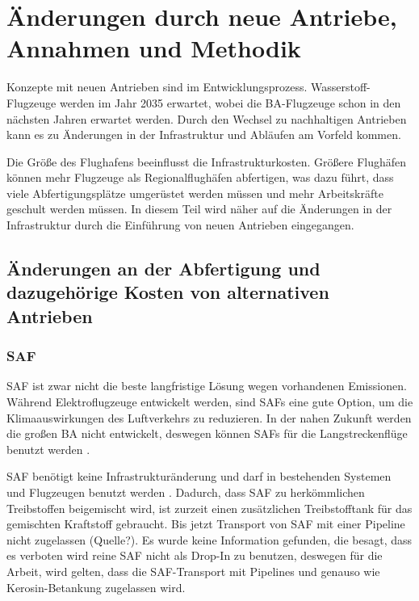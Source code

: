 \chapter{Änderungen durch neue Antriebe, Annahmen und Methodik}
\label{ch:Änderungen durch neue Antriebe, Annahmen und Methodik}

Konzepte mit neuen Antrieben sind im Entwicklungsprozess. Wasserstoff-Flugzeuge werden im Jahr 2035 erwartet, wobei die BA-Flugzeuge
schon in den nächsten Jahren erwartet werden.
Durch den Wechsel zu nachhaltigen Antrieben kann es zu Änderungen in der Infrastruktur und Abläufen am Vorfeld kommen.


Die Größe des Flughafens beeinflusst die Infrastrukturkosten. Größere Flughäfen können mehr Flugzeuge als Regionalflughäfen 
abfertigen, was dazu führt, dass viele Abfertigungsplätze umgerüstet werden müssen und 
mehr Arbeitskräfte geschult werden müssen. In diesem Teil wird näher auf die Änderungen in der Infrastruktur durch die Einführung 
von neuen Antrieben eingegangen.

\section{Änderungen an der Abfertigung und dazugehörige Kosten von alternativen Antrieben}
\label{s:Änderungen an der Abfertigung und dazugehörige Kosten von alternativen Antrieben}

\subsection{SAF}

SAF ist zwar nicht die beste langfristige Lösung wegen vorhandenen Emissionen. 
Während Elektroflugzeuge entwickelt werden, sind SAFs eine gute Option, um die Klimaauswirkungen des Luftverkehrs zu reduzieren.
In der nahen Zukunft werden die großen BA nicht entwickelt, deswegen können SAFs für die Langstreckenflüge benutzt werden \cite{dalmia2022powering}.


SAF benötigt keine Infrastrukturänderung und darf in bestehenden Systemen und Flugzeugen benutzt werden \cite{dalmia2022powering}.
Dadurch, dass SAF zu herkömmlichen Treibstoffen beigemischt wird, ist zurzeit einen zusätzlichen Treibstofftank 
für das gemischten Kraftstoff gebraucht. Bis jetzt Transport von SAF mit einer Pipeline nicht zugelassen (Quelle?).
Es wurde keine Information gefunden, die besagt, dass es verboten wird reine SAF nicht als
Drop-In zu benutzen, deswegen für die Arbeit, wird gelten, dass die SAF-Transport mit Pipelines und genauso wie Kerosin-Betankung zugelassen wird.

